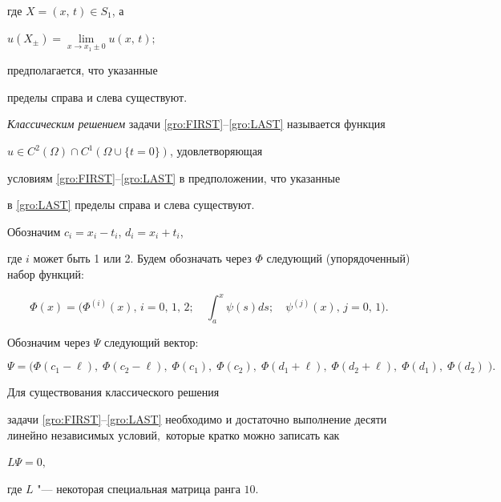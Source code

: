  где $X = (x,\,t) \in S_1$, а

$

  u(X_{\pm}) = \lim\limits_{x\to x_1\pm 0} u(x,\,t);

$

предполагается, что указанные

пределы справа и слева существуют.



\begin{definition}[1.1]\textit{Классическим решением} задачи \eqref{gro:FIRST}--\eqref{gro:LAST} называется \linebreak функция

$u \in C^2(\Omega) \cap C^1 (\Omega\cup\{t=0\})$, удовлетворяющая

условиям \eqref{gro:FIRST}--\eqref{gro:LAST} в предположении, что указанные

в  \eqref{gro:LAST} пределы справа и слева существуют.

\end{definition}



\smallskip

Обозначим $ c_i = x_i - t_i$, $d_i = x_i + t_i$,

где $i$ может быть 1 или 2. Будем обозначать через $\Phi$ следующий (упорядоченный) набор функций:

\begin{equation*}

  \Phi(x) = \biggl(\Phi^{(i)}(x),\,i = 0,\, 1,\, 2;\quad \int ^{x}_{a} \psi(s) ds;\quad \psi^{(j)}(x),\,j = 0,\, 1\biggr).

\end{equation*}

Обозначим через $\Psi$ следующий вектор:

 \begin{equation*}

  \Psi = \bigl(\Phi(c_1-\ell),\; \Phi(c_2-\ell),\; \Phi(c_1),\; \Phi(c_2),\; \Phi(d_1+\ell),\; \Phi(d_2+\ell),\; \Phi(d_1),\; \Phi(d_2)\;\bigr).

\end{equation*}



\begin{theorem}[1.1]Для существования классического решения

задачи \eqref{gro:FIRST}--\eqref{gro:LAST} необходимо и достаточно выполнение десяти линейно независимых условий$,$ которые кратко можно записать как



$  L\Psi = 0,$


где $L$ "--- некоторая специальная матрица ранга $10.$

\end{theorem}



